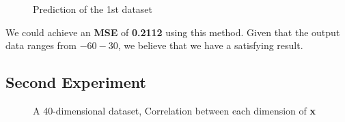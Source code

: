 \begin{figure}[htp]
\begin{minipage}[htp]{1\linewidth}
	\centering
\caption{Prediction of the 1st dataset}
\label{fig:predict1} %
\end{minipage}
\vspace{-0.05in}
\end{figure}

We could achieve an \textbf{MSE} of \textbf{0.2112} using this method. Given that the output data ranges from $-60 - 30$, we believe that we have a satisfying result.



\subsection{Second Experiment}

\begin{figure}[htp]
\begin{minipage}[htp]{1\linewidth}
	\centering
\caption{A 40-dimensional dataset, Correlation between each dimension of \textbf{x}}
\label{fig:data2}
\end{minipage}
\vspace{-0.05in}
\end{figure}

